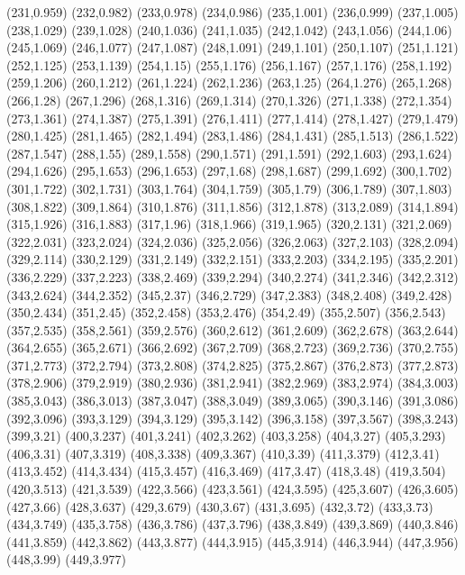 (231,0.959)
(232,0.982)
(233,0.978)
(234,0.986)
(235,1.001)
(236,0.999)
(237,1.005)
(238,1.029)
(239,1.028)
(240,1.036)
(241,1.035)
(242,1.042)
(243,1.056)
(244,1.06)
(245,1.069)
(246,1.077)
(247,1.087)
(248,1.091)
(249,1.101)
(250,1.107)
(251,1.121)
(252,1.125)
(253,1.139)
(254,1.15)
(255,1.176)
(256,1.167)
(257,1.176)
(258,1.192)
(259,1.206)
(260,1.212)
(261,1.224)
(262,1.236)
(263,1.25)
(264,1.276)
(265,1.268)
(266,1.28)
(267,1.296)
(268,1.316)
(269,1.314)
(270,1.326)
(271,1.338)
(272,1.354)
(273,1.361)
(274,1.387)
(275,1.391)
(276,1.411)
(277,1.414)
(278,1.427)
(279,1.479)
(280,1.425)
(281,1.465)
(282,1.494)
(283,1.486)
(284,1.431)
(285,1.513)
(286,1.522)
(287,1.547)
(288,1.55)
(289,1.558)
(290,1.571)
(291,1.591)
(292,1.603)
(293,1.624)
(294,1.626)
(295,1.653)
(296,1.653)
(297,1.68)
(298,1.687)
(299,1.692)
(300,1.702)
(301,1.722)
(302,1.731)
(303,1.764)
(304,1.759)
(305,1.79)
(306,1.789)
(307,1.803)
(308,1.822)
(309,1.864)
(310,1.876)
(311,1.856)
(312,1.878)
(313,2.089)
(314,1.894)
(315,1.926)
(316,1.883)
(317,1.96)
(318,1.966)
(319,1.965)
(320,2.131)
(321,2.069)
(322,2.031)
(323,2.024)
(324,2.036)
(325,2.056)
(326,2.063)
(327,2.103)
(328,2.094)
(329,2.114)
(330,2.129)
(331,2.149)
(332,2.151)
(333,2.203)
(334,2.195)
(335,2.201)
(336,2.229)
(337,2.223)
(338,2.469)
(339,2.294)
(340,2.274)
(341,2.346)
(342,2.312)
(343,2.624)
(344,2.352)
(345,2.37)
(346,2.729)
(347,2.383)
(348,2.408)
(349,2.428)
(350,2.434)
(351,2.45)
(352,2.458)
(353,2.476)
(354,2.49)
(355,2.507)
(356,2.543)
(357,2.535)
(358,2.561)
(359,2.576)
(360,2.612)
(361,2.609)
(362,2.678)
(363,2.644)
(364,2.655)
(365,2.671)
(366,2.692)
(367,2.709)
(368,2.723)
(369,2.736)
(370,2.755)
(371,2.773)
(372,2.794)
(373,2.808)
(374,2.825)
(375,2.867)
(376,2.873)
(377,2.873)
(378,2.906)
(379,2.919)
(380,2.936)
(381,2.941)
(382,2.969)
(383,2.974)
(384,3.003)
(385,3.043)
(386,3.013)
(387,3.047)
(388,3.049)
(389,3.065)
(390,3.146)
(391,3.086)
(392,3.096)
(393,3.129)
(394,3.129)
(395,3.142)
(396,3.158)
(397,3.567)
(398,3.243)
(399,3.21)
(400,3.237)
(401,3.241)
(402,3.262)
(403,3.258)
(404,3.27)
(405,3.293)
(406,3.31)
(407,3.319)
(408,3.338)
(409,3.367)
(410,3.39)
(411,3.379)
(412,3.41)
(413,3.452)
(414,3.434)
(415,3.457)
(416,3.469)
(417,3.47)
(418,3.48)
(419,3.504)
(420,3.513)
(421,3.539)
(422,3.566)
(423,3.561)
(424,3.595)
(425,3.607)
(426,3.605)
(427,3.66)
(428,3.637)
(429,3.679)
(430,3.67)
(431,3.695)
(432,3.72)
(433,3.73)
(434,3.749)
(435,3.758)
(436,3.786)
(437,3.796)
(438,3.849)
(439,3.869)
(440,3.846)
(441,3.859)
(442,3.862)
(443,3.877)
(444,3.915)
(445,3.914)
(446,3.944)
(447,3.956)
(448,3.99)
(449,3.977)
